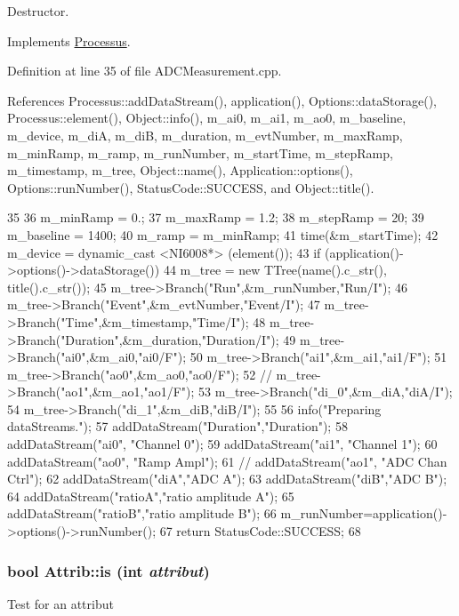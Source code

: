 Destructor. 

Implements \hyperlink{classProcessus_aee88ad7b77ae7319cf8b128e9dd2ea11}{Processus}.

Definition at line 35 of file ADCMeasurement.cpp.

References Processus::addDataStream(), application(), Options::dataStorage(), Processus::element(), Object::info(), m\_\-ai0, m\_\-ai1, m\_\-ao0, m\_\-baseline, m\_\-device, m\_\-diA, m\_\-diB, m\_\-duration, m\_\-evtNumber, m\_\-maxRamp, m\_\-minRamp, m\_\-ramp, m\_\-runNumber, m\_\-startTime, m\_\-stepRamp, m\_\-timestamp, m\_\-tree, Object::name(), Application::options(), Options::runNumber(), StatusCode::SUCCESS, and Object::title().


\begin{DoxyCode}
35                                         {
36   m_minRamp  = 0.; 
37   m_maxRamp  = 1.2;
38   m_stepRamp = 20;
39   m_baseline = 1400;
40   m_ramp = m_minRamp;
41   time(&m_startTime); 
42   m_device = dynamic_cast <NI6008*> (element());
43   if (application()->options()->dataStorage()){
44     m_tree = new TTree(name().c_str(), title().c_str());
45     m_tree->Branch("Run",&m_runNumber,"Run/I");
46     m_tree->Branch("Event",&m_evtNumber,"Event/I");
47     m_tree->Branch("Time",&m_timestamp,"Time/I");
48     m_tree->Branch("Duration",&m_duration,"Duration/I");
49     m_tree->Branch("ai0",&m_ai0,"ai0/F");
50     m_tree->Branch("ai1",&m_ai1,"ai1/F");
51     m_tree->Branch("ao0",&m_ao0,"ao0/F");
52     //    m_tree->Branch("ao1",&m_ao1,"ao1/F");
53     m_tree->Branch("di_0",&m_diA,"diA/I");
54     m_tree->Branch("di_1",&m_diB,"diB/I");
55   }
56   info("Preparing dataStreams.");
57   addDataStream("Duration","Duration");
58   addDataStream("ai0", "Channel 0");
59   addDataStream("ai1", "Channel 1");
60   addDataStream("ao0", "Ramp Ampl");
61   //  addDataStream("ao1", "ADC Chan Ctrl");
62   addDataStream("diA","ADC A");
63   addDataStream("diB","ADC B");
64   addDataStream("ratioA","ratio amplitude A");
65   addDataStream("ratioB","ratio amplitude B");
66   m_runNumber=application()->options()->runNumber();
67   return StatusCode::SUCCESS;
68 }
\end{DoxyCode}
\hypertarget{classAttrib_a704f26af560909ad22065083bb7d4c34}{
\subsubsection[{is}]{\setlength{\rightskip}{0pt plus 5cm}bool Attrib::is (int {\em attribut})}}
\label{classAttrib_a704f26af560909ad22065083bb7d4c34}
Test for an attribut 

